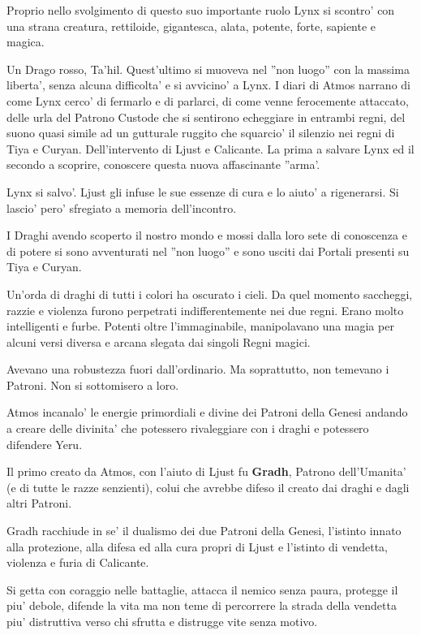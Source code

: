 \documentclass[a4paper,11pt,twoside,openany]{book}
\begin{document}
{		Proprio nello svolgimento di questo suo importante ruolo Lynx si scontro' con una strana creatura, rettiloide, gigantesca, alata, potente, forte, sapiente e magica.
		
		Un Drago rosso, Ta'hil. Quest'ultimo si muoveva nel ''non luogo'' con la massima liberta', senza alcuna difficolta' e si avvicino' a Lynx. I diari di Atmos narrano di come Lynx cerco' di fermarlo e di parlarci, di come venne ferocemente attaccato, delle urla del Patrono Custode che si sentirono echeggiare in entrambi regni, del suono quasi simile ad un gutturale ruggito che squarcio' il silenzio nei regni di Tiya e Curyan. Dell'intervento di Ljust e Calicante. La prima a salvare Lynx ed il secondo a scoprire, conoscere questa nuova affascinante ''arma'.
		
		Lynx si salvo'. Ljust gli infuse le sue essenze di cura e lo aiuto' a rigenerarsi. Si lascio' pero' sfregiato a memoria dell'incontro.
		
		I Draghi avendo scoperto il nostro mondo e mossi dalla loro sete di conoscenza e di potere si sono avventurati nel ''non luogo'' e sono usciti dai Portali presenti su Tiya e Curyan.
		
		Un'orda di draghi di tutti i colori ha oscurato i cieli. Da quel momento saccheggi, razzie e violenza furono perpetrati indifferentemente nei due regni. Erano molto intelligenti e furbe. Potenti oltre l'immaginabile, manipolavano una magia per alcuni versi diversa e arcana slegata dai singoli Regni magici.
		
		Avevano una robustezza fuori dall'ordinario. Ma soprattutto, non temevano i Patroni. Non si sottomisero a loro.
		
		Atmos incanalo' le energie primordiali e divine dei Patroni della Genesi andando a creare delle divinita' che potessero rivaleggiare con i draghi e potessero difendere Yeru.
		
		Il primo creato da Atmos, con l'aiuto di Ljust fu \textbf{Gradh}, Patrono dell'Umanita' (e di tutte le razze senzienti), colui che avrebbe difeso il creato dai draghi e dagli altri Patroni.
		
		Gradh racchiude in se' il dualismo dei due Patroni della Genesi, l'istinto innato alla protezione, alla difesa ed alla cura propri di Ljust e l'istinto di vendetta, violenza e furia di Calicante.
		
		Si getta con coraggio nelle battaglie, attacca il nemico senza paura, protegge il piu' debole, difende la vita ma non teme di percorrere la strada della vendetta piu' distruttiva verso chi sfrutta e distrugge vite senza motivo.
		
}
\end{document}
